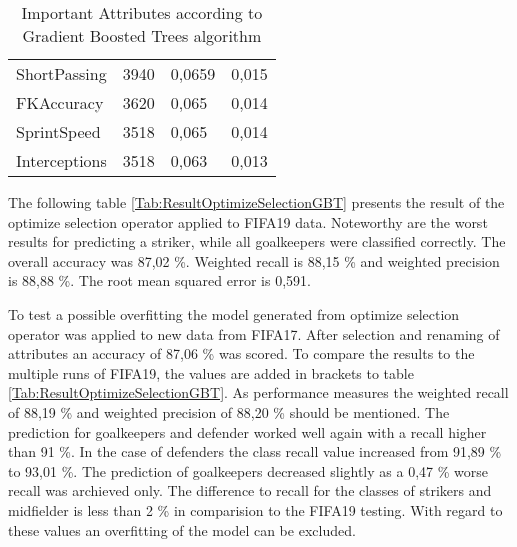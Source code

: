 \begin{table}[]
\begin{tabular}{@{}llll@{}}
ShortPassing    & 3940                                                                                                                                   & 0,0659                                                                                                                               & 0,015      \\
FKAccuracy      & 3620                                                                                                                                   & 0,065                                                                                                                                & 0,014      \\
SprintSpeed     & 3518                                                                                                                                   & 0,065                                                                                                                                & 0,014      \\
Interceptions   & 3518                                                                                                                                   & 0,063                                                                                                                                & 0,013      \\ \hline
\end{tabular}
\label{Tab:GBTImportantAttributes}
\caption{Important Attributes according to Gradient Boosted Trees algorithm}
\end{table}

The following table \ref{Tab:ResultOptimizeSelectionGBT} presents the result of the optimize selection operator applied to FIFA19 data. Noteworthy are the worst results for predicting a striker, while all goalkeepers were classified correctly. The overall accuracy was 87,02 \%. Weighted recall is 88,15 \% and weighted precision is 88,88 \%. The root mean squared error is 0,591. 

To test a possible overfitting the model generated from optimize selection operator was applied to new data from FIFA17. After selection and renaming of attributes an accuracy of 87,06 \% was scored. To compare the results to the multiple runs of FIFA19, the values are added in brackets to table \ref{Tab:ResultOptimizeSelectionGBT}. As performance measures the weighted recall of 88,19 \% and weighted precision of 88,20 \% should be mentioned.
The prediction for goalkeepers and defender worked well again with a recall higher than 91 \%. In the case of defenders the class recall value increased from 91,89 \% to 93,01 \%. The prediction of goalkeepers decreased slightly as a 0,47 \% worse recall was archieved only. The difference to recall for the classes of strikers and midfielder is less than 2 \% in comparision to the FIFA19 testing. With regard to these values an overfitting of the model can be excluded. 

